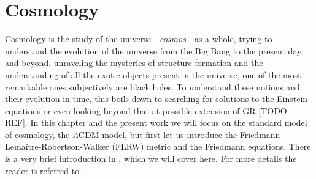 \chapter{Cosmology}\label{ch:cosmology}
Cosmology is the study of the universe - \emph{cosmos} - as a whole, trying to understand the evolution of the universe from the Big Bang to the present day and beyond, unraveling the mysteries of structure formation and the understanding of all the exotic objects present in the universe, one of the most remarkable ones subjectively are black holes. To understand these notions and their evolution in time, this boils down to searching for solutions to the Einstein equations or even looking beyond that at possible extension of GR [TODO: REF]. In this chapter and the present work we will focus on the standard model of cosmology, the $\Lambda$CDM model, but first let us introduce the Friedmann-Lemaître-Robertson-Walker (FLRW) metric and the Friedmann equations. There is a very brief introduction in \cite{10.1093/acprof:oso/9780198570745.001.0001}, which we will cover here. For more details the reader is referred to \cite{10.1093/acprof:oso/9780198570745.001.0001}.
